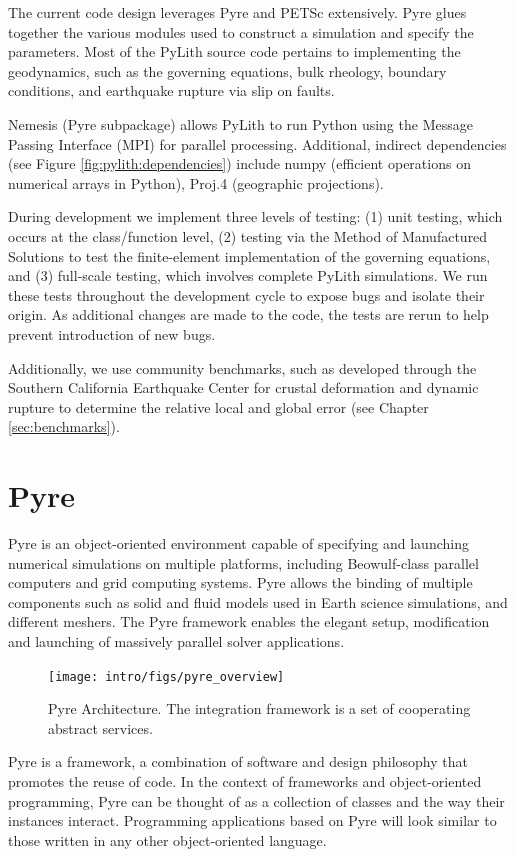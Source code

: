 The current code design leverages Pyre and PETSc extensively. Pyre
glues together the various modules used to construct a simulation and
specify the parameters. Most of the PyLith source code pertains to
implementing the geodynamics, such as the governing equations, bulk
rheology, boundary conditions, and earthquake rupture via slip on
faults.

Nemesis (Pyre subpackage) allows PyLith to run Python using the
Message Passing Interface (MPI) for parallel processing. Additional,
indirect dependencies (see Figure \vref{fig:pylith:dependencies})
include numpy (efficient operations on numerical arrays in Python),
Proj.4 (geographic projections).

During development we implement three levels of testing: (1) unit
testing, which occurs at the class/function level, (2) testing via the
Method of Manufactured Solutions to test the finite-element
implementation of the governing equations, and (3) full-scale testing,
which involves complete PyLith simulations. We run these tests
throughout the development cycle to expose bugs and isolate their
origin. As additional changes are made to the code, the tests are
rerun to help prevent introduction of new bugs.

Additionally, we use community benchmarks, such as developed through
the Southern California Earthquake Center for crustal deformation and
dynamic rupture to determine the relative local and global error (see
Chapter \vref{sec:benchmarks}).

\section{Pyre}

Pyre is an object-oriented environment capable of specifying and launching
numerical simulations on multiple platforms, including Beowulf-class
parallel computers and grid computing systems. Pyre allows the binding
of multiple components such as solid and fluid models used in Earth
science simulations, and different meshers. The Pyre framework enables
the elegant setup, modification and launching of massively parallel
solver applications.

\begin{figure}[htbp]
  \texttt{[image: intro/figs/pyre\_overview]}
  \caption{Pyre Architecture. The integration framework is a set of
    cooperating abstract services.}
  \label{fig:Pyre:Architecture}
\end{figure}

Pyre is a framework, a combination of software and design philosophy
that promotes the reuse of code. In the context of frameworks and
object-oriented programming, Pyre can be thought of as a collection of
classes and the way their instances interact.  Programming
applications based on Pyre will look similar to those written in any
other object-oriented language. 

